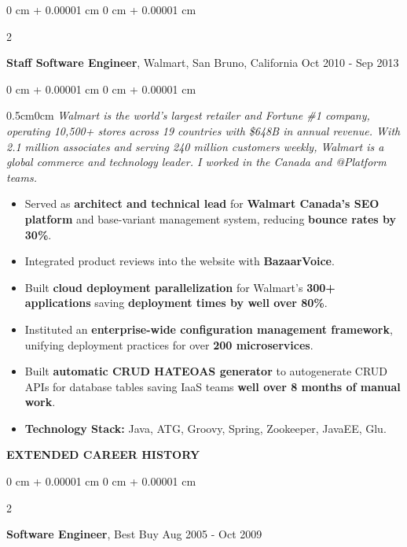 \documentclass[10pt, letterpaper]{article}
\newenvironment{highlights}{
    \begin{itemize}[
        topsep=0.10 cm,
        parsep=0.10 cm,
        partopsep=0pt,
        itemsep=0pt,
        leftmargin=0 cm + 10pt
    ]
}{
    \end{itemize}
} %
\newenvironment{onecolentry}{
    \begin{adjustwidth}{
        0 cm + 0.00001 cm
    }{
        0 cm + 0.00001 cm
    }
}{
    \end{adjustwidth}
} %
\newenvironment{twocolentry}[2][]{
    \onecolentry
    \def\secondColumn{#2}
    \setcolumnwidth{\fill, 4.5 cm}
    \begin{paracol}{2}
}{
    \switchcolumn \raggedleft \secondColumn
    \end{paracol}
    \endonecolentry
} %
\begin{document}
        \vspace{0.20 cm}
        \begin{twocolentry}{
            Oct 2010 - Sep 2013
        }
            \textbf{Staff Software Engineer}, Walmart, San Bruno, California\end{twocolentry}
        \vspace{0.10 cm}
        \begin{onecolentry}
            \begin{adjustwidth}{0.5cm}{0cm}
            \textit{Walmart is the world's largest retailer and Fortune \#1 company, operating 10,500+ stores across 19 countries with \$648B in annual revenue. With 2.1 million associates and serving 240 million customers weekly, Walmart is a global commerce and technology leader. I worked in the Canada and @Platform teams.}
            \end{adjustwidth}
            
            \vspace{0.10 cm}
            \begin{highlights}
                \item Served as \textbf{architect and technical lead} for \textbf{Walmart Canada's SEO platform} and base-variant management system, reducing \textbf{bounce rates by 30\%}.
                \item Integrated product reviews into the website with \textbf{BazaarVoice}.
                \item Built \textbf{cloud deployment parallelization} for Walmart's \textbf{300+ applications} saving \textbf{deployment times by well over 80\%}.
                \item Instituted an \textbf{enterprise-wide configuration management framework}, unifying deployment practices for over \textbf{200 microservices}.
                \item Built \textbf{automatic CRUD HATEOAS generator} to autogenerate CRUD APIs for database tables saving IaaS teams \textbf{well over 8 months of manual work}.
                \item \textbf{Technology Stack:} Java, ATG, Groovy, Spring, Zookeeper, JavaEE, Glu.
            \end{highlights}
        \end{onecolentry}

        \vspace{0.20 cm}
        \textbf{EXTENDED CAREER HISTORY}
        
        \vspace{0.10 cm}
        \begin{twocolentry}{
            Aug 2005 - Oct 2009
        }
            \textbf{Software Engineer}, Best Buy\end{twocolentry}
        
\end{document}
